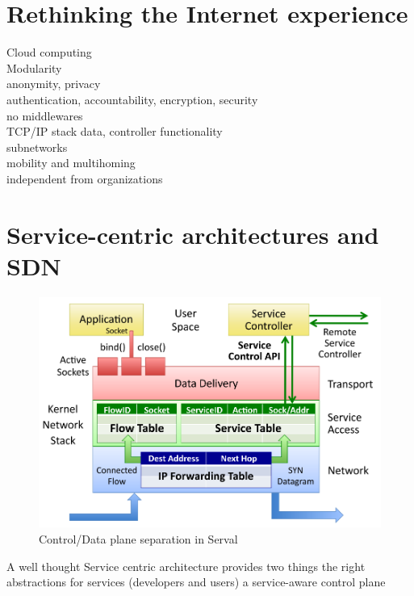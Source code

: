 \documentclass[12pt,a4paper,oneside]{article}
\begin{document}
\section{Rethinking the Internet experience}
Cloud computing
\\Modularity
\\anonymity, privacy
\\authentication, accountability, encryption, security
\\no middlewares
\\TCP/IP stack data, controller functionality
\\subnetworks
\\mobility and multihoming
\\independent from organizations

\newpage
\section{Service-centric architectures and SDN}

\begin{figure}
\centering
{}
\includegraphics[scale=0.3]{figures/SAL_plane_split}
\caption[Control/Data plane separation in Serval]{Control/Data plane separation in Serval}
\label{fig:sal_plane_split}
\end{figure}

A well thought Service centric architecture provides two things
the right abstractions for services (developers and users)
a service-aware control plane
\end{document}
